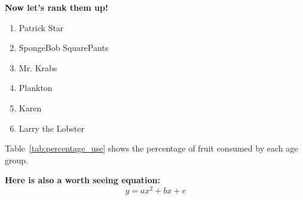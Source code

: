 \textbf{Now let's rank them up!}
\begin{enumerate}
  \item Patrick Star
  \item SpongeBob SquarePants
  \item Mr. Krabs
  \item Plankton
  \item Karen
  \item Larry the Lobster
\end{enumerate}

Table~\ref{tab:percentage_use} shows the percentage of fruit consumed by each age group.

\begin{table}[H] 
    \centering
    
\end{table}

\textbf{Here is also a worth seeing equation:} \[y=ax^2+bx+c\]